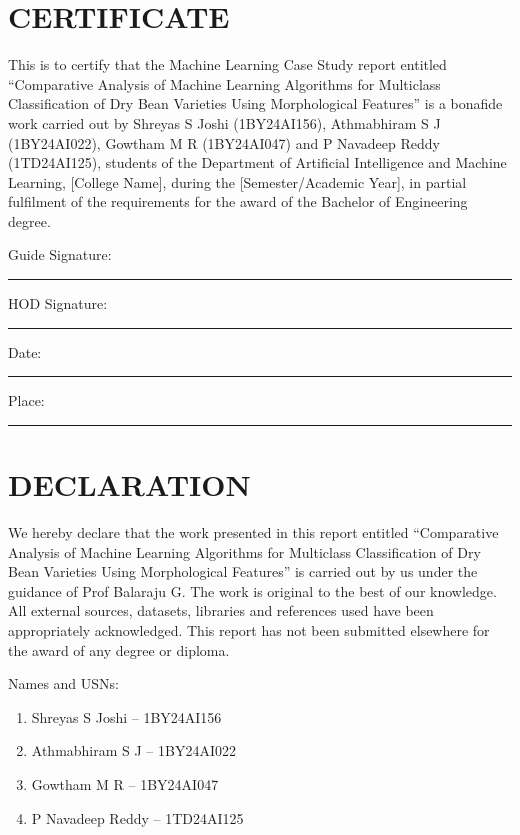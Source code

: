 \chapter*{CERTIFICATE}
\thispagestyle{frontmatter}

This is to certify that the Machine Learning Case Study report entitled
``Comparative Analysis of Machine Learning Algorithms for Multiclass
Classification of Dry Bean Varieties Using Morphological Features'' is a
bonafide work carried out by Shreyas S Joshi (1BY24AI156), Athmabhiram S J
(1BY24AI022), Gowtham M R (1BY24AI047) and P Navadeep Reddy (1TD24AI125),
students of the Department of Artificial Intelligence and Machine Learning,
[College Name], during the [Semester/Academic Year], in partial fulfilment of the
requirements for the award of the Bachelor of Engineering degree.

\vspace{2.6cm}
\noindent
Guide Signature: \rule{4.2cm}{0.4pt} \hfill HOD Signature: \rule{4.2cm}{0.4pt}

\vspace{1.6cm}
\noindent
Date: \rule{4.2cm}{0.4pt} \hfill Place: \rule{4.2cm}{0.4pt}

\chapter*{DECLARATION}
\thispagestyle{frontmatter}

We hereby declare that the work presented in this report entitled ``Comparative
Analysis of Machine Learning Algorithms for Multiclass Classification of Dry Bean
Varieties Using Morphological Features'' is carried out by us under the guidance
of Prof Balaraju G. The work is original to the best of our knowledge. All external
sources, datasets, libraries and references used have been appropriately
acknowledged. This report has not been submitted elsewhere for the award of any
degree or diploma.

\vspace{1.4cm}
\noindent Names and USNs:
\begin{enumerate}[label=\arabic*.,leftmargin=1.6em,itemsep=0.35cm]
  \item Shreyas S Joshi -- 1BY24AI156
  \item Athmabhiram S J -- 1BY24AI022
  \item Gowtham M R -- 1BY24AI047
  \item P Navadeep Reddy -- 1TD24AI125
\end{enumerate}

